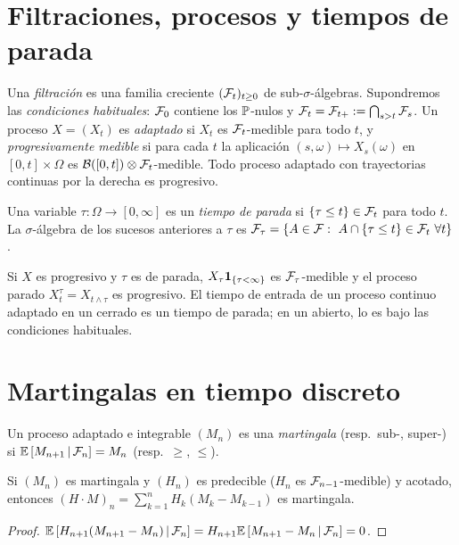 \section{Filtraciones, procesos y tiempos de parada}
Una \emph{filtración} es una familia creciente $(\F_t)_{t\ge0}$ de sub-$\sigma$-álgebras. Supondremos las \emph{condiciones
habituales}: $\F_0$ contiene los $\P$-nulos y $\F_t=\F_{t+}:=\bigcap_{s>t}\F_s$. Un proceso $X=(X_t)$ es \emph{adaptado}
si $X_t$ es $\F_t$-medible para todo $t$, y \emph{progresivamente medible} si para cada $t$ la aplicación $(s,\omega)\mapsto
X_s(\omega)$ en $[0,t]\times\Omega$ es $\mathcal B([0,t])\otimes\F_t$-medible. Todo proceso adaptado con trayectorias continuas
por la derecha es progresivo.

\begin{definicion}
Una variable $\tau:\Omega\to[0,\infty]$ es un \emph{tiempo de parada} si $\{\tau\le t\}\in\F_t$ para
todo $t$. La $\sigma$-álgebra de los sucesos anteriores a $\tau$ es $\F_\tau=\{A\in\F:\ A\cap\{\tau\le t\}\in\F_t\ \forall t\}$.
\end{definicion}

Si $X$ es progresivo y $\tau$ es de parada, $X_\tau\ind_{\{\tau<\infty\}}$ es $\F_\tau$-medible y el proceso parado $X^\tau_t=X_{t\wedge\tau}$
es progresivo. El tiempo de entrada de un proceso continuo adaptado en un cerrado es un
tiempo de parada; en un abierto, lo es bajo las condiciones habituales.

\section{Martingalas en tiempo discreto}

\begin{definicion}
Un proceso adaptado e integrable $(M_n)$ es una \emph{martingala} (resp.\ sub-,
super-) si $\cond{M_{n+1}}{\F_n}=M_n$ (resp.\ $\ge$, $\le$).
\end{definicion}

\begin{lema}\label{lem:transformada}
Si $(M_n)$ es martingala y $(H_n)$ es \textup{predecible} ($H_n$ es
$\F_{n-1}$-medible) y acotado, entonces $(H\cdot M)_n=\sum_{k=1}^nH_k(M_k-M_{k-1})$ es martingala.
\end{lema}

\begin{proof}
$\cond{H_{n+1}(M_{n+1}-M_n)}{\F_n}=H_{n+1}\cond{M_{n+1}-M_n}{\F_n}=0$.
\end{proof}

